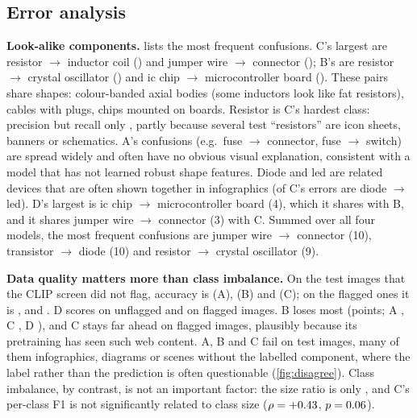 \documentclass[11pt,a4paper]{article}
\newcommand{\cls}[1]{#1}
\begin{document}
\subsection{Error analysis}\label{sec:errors}
\textbf{Look-alike components.}  lists the most frequent confusions. C's largest are
\cls{resistor} $\to$ \cls{inductor coil} (\cmResIndC) and \cls{jumper wire} $\to$ \cls{connector} (\cmJumpConC); B's are
\cls{resistor} $\to$ \cls{crystal oscillator} (\cmResXtalB) and \cls{ic chip} $\to$ \cls{microcontroller board}
(\cmIcMcuB). These pairs share shapes: colour-banded axial bodies (some inductors look like fat resistors), cables
with plugs, chips mounted on boards. \cls{Resistor} is C's hardest class: precision \precResC but recall only
\recResC, partly because several test ``resistors'' are icon sheets, banners or schematics. A's confusions (e.g.\
\cls{fuse} $\to$ \cls{connector}, \cls{fuse} $\to$ \cls{switch}) are spread widely and often have no obvious visual
explanation, consistent with a model that has not learned robust shape features. \cls{Diode} and \cls{led} are
related devices that are often shown together in infographics (\cmDiodeLedC of C's errors are \cls{diode} $\to$ \cls{led}).
D's largest is \cls{ic chip} $\rightarrow$ \cls{microcontroller board} (4), which it shares with B, and it shares \cls{jumper wire} $\rightarrow$ \cls{connector} (3) with C. Summed over all four models, the most frequent confusions are \cls{jumper wire} $\rightarrow$ \cls{connector} (10), \cls{transistor} $\rightarrow$ \cls{diode} (10) and \cls{resistor} $\rightarrow$ \cls{crystal oscillator} (9).

\begin{table}[!tbp]
\centering\scriptsize
\caption{Most frequent test confusions (true $\rightarrow$ predicted) per model, from their recorded confusion matrices; equal counts are listed alphabetically. MCU board: microcontroller board; crystal osc.: crystal oscillator; PSU module: power supply module.}
\label{tab:confused}
\setlength{\tabcolsep}{3.5pt}

\end{table}

\textbf{Data quality matters more than class imbalance.} On the \nTestClean test images that the CLIP screen did not
flag, accuracy is \accCleanA (A), \accCleanB (B) and \accCleanC (C); on the \oodTest flagged ones it is \accOODA,
\accOODB and \accOODC. D scores \accCleanD{} on unflagged and \accOODD{} on flagged images. B loses most (\oodDropB points; A \oodDropA,
C \oodDropC, D \oodDropD), and C stays far ahead on flagged images, plausibly because its pretraining has seen such web content. A, B and C
fail on \allWrong test images, many of them infographics, diagrams or scenes without the labelled component, where
the label rather than the prediction is often questionable (\cref{fig:disagree}). Class imbalance, by contrast, is not
an important factor: the size ratio is only \imbalance, and C's per-class F1 is not significantly related to class
size ($\rho=+0.43$, $p=0.06$).
\end{document}
